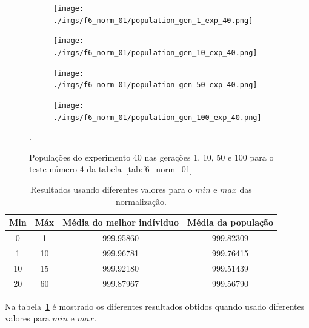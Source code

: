 \documentclass[12pt]{article}
\begin{document}
		\begin{figure}[htb]
		\begin{subfigure}{.5\textwidth}
			\centering
			\texttt{[image: ./imgs/f6\_norm\_01/population\_gen\_1\_exp\_40.png]}
		  \end{subfigure}
		  \begin{subfigure}{.5\textwidth}
			\centering
			\texttt{[image: ./imgs/f6\_norm\_01/population\_gen\_10\_exp\_40.png]}
		  \end{subfigure}
		  \begin{subfigure}{.5\textwidth}
			\centering
			\texttt{[image: ./imgs/f6\_norm\_01/population\_gen\_50\_exp\_40.png]}
		  \end{subfigure}
		  \begin{subfigure}{.5\textwidth}
			\centering
			\texttt{[image: ./imgs/f6\_norm\_01/population\_gen\_100\_exp\_40.png]}
		  \end{subfigure}
		\caption{Populações do experimento 40 nas gerações 1, 10, 50 e 100 para o teste número 4 da tabela~\ref{tab:f6_norm_01}}.
		\end{figure}

		\begin{table}[htb]
			\centering
			\begin{tabular}{|c|c|c|c|}
				\hline
				\rowcolor[HTML]{9B9B9B}
				Min & Máx & Média do melhor indíviduo & Média da população \\\hline
				0 & 1 & 999.95860 & 999.82309 \\\hline
				1 & 10 & 999.96781 & 999.76415 \\\hline
				10 & 15 & 999.92180 & 999.51439 \\\hline
				20 & 60 & 999.87967 & 999.56790 \\\hline
			\end{tabular}
			\caption{Resultados usando diferentes valores para o $min$ e $max$ das
			normalização. \label{tab:norm}}
		\end{table}

		Na tabela~\ref{tab:norm} é mostrado os diferentes resultados obtidos quando
		usado diferentes valores para $min$ e $max$.
\end{document}
